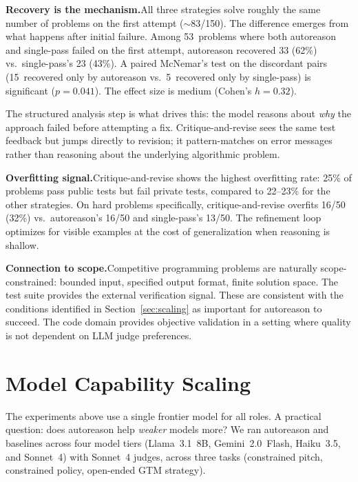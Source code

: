 \documentclass[11pt]{article}
\begin{document}
\textbf{Recovery is the mechanism.}\enspace All three strategies solve roughly the same number of problems on the first attempt (${\sim}$83/150). The difference emerges from what happens after initial failure. Among 53~problems where both autoreason and single-pass failed on the first attempt, autoreason recovered 33 (62\%) vs.\ single-pass's 23 (43\%). A paired McNemar's test on the discordant pairs (15~recovered only by autoreason vs.\ 5~recovered only by single-pass) is significant ($p{=}0.041$). The effect size is medium (Cohen's $h{=}0.32$).

The structured analysis step is what drives this: the model reasons about \textit{why} the approach failed before attempting a fix. Critique-and-revise sees the same test feedback but jumps directly to revision; it pattern-matches on error messages rather than reasoning about the underlying algorithmic problem.

\textbf{Overfitting signal.}\enspace Critique-and-revise shows the highest overfitting rate: 25\% of problems pass public tests but fail private tests, compared to 22--23\% for the other strategies. On hard problems specifically, critique-and-revise overfits 16/50 (32\%) vs.\ autoreason's 16/50 and single-pass's 13/50. The refinement loop optimizes for visible examples at the cost of generalization when reasoning is shallow.

\textbf{Connection to scope.}\enspace Competitive programming problems are naturally scope-constrained: bounded input, specified output format, finite solution space. The test suite provides the external verification signal. These are consistent with the conditions identified in Section~\ref{sec:scaling} as important for autoreason to succeed. The code domain provides objective validation in a setting where quality is not dependent on LLM judge preferences.

\section{Model Capability Scaling}
\label{sec:small}

The experiments above use a single frontier model for all roles. A practical question: does autoreason help \textit{weaker} models more? We ran autoreason and baselines across four model tiers (Llama~3.1~8B, Gemini~2.0~Flash, Haiku~3.5, and Sonnet~4) with Sonnet~4 judges, across three tasks (constrained pitch, constrained policy, open-ended GTM strategy).
\end{document}
